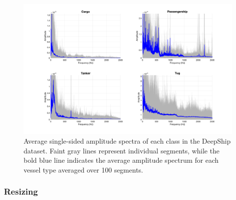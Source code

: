 \begin{figure}[htbp]
    \centering



    \includegraphics[trim={3.5cm 1cm 2.5cm 1cm},clip,width=\textwidth]{img/ch3/freq_ampl/average_spectra_all.pdf}
    
    \caption{Average single-sided amplitude spectra of each class in the DeepShip dataset. Faint gray lines represent individual segments, while the bold blue line indicates the average amplitude spectrum for each vessel type averaged over 100 segments.}
    \label{fig:freq-ampl-highf}
\end{figure}

\subsubsection{Resizing}

